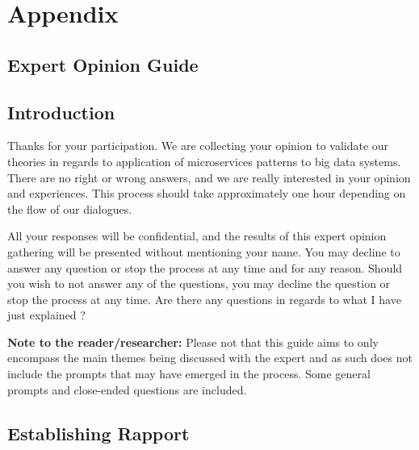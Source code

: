 \documentclass{bmcart}
\begin{document}
\section*{Appendix}


\begin{backmatter}

\section*{Expert Opinion Guide} \label{interviewGuide}

\subsection*{Introduction}

Thanks for your participation. We are collecting your opinion to validate our theories in regards to application of microservices patterns to big data systems. There are no right or wrong answers, and we are really interested in your opinion and experiences. This process should take approximately one hour depending on the flow of our dialogues. 

All your responses will be confidential, and the results of this expert opinion gathering will be presented without mentioning your name. You may decline to answer any question or stop the process at any time and for any reason. Should you wish to not answer any of the questions, you may decline the question or stop the process at any time. Are there any questions in regards to what I have just explained ?

\hspace{2cm}

\textbf{Note to the reader/researcher:} Please not that this guide aims to only encompass the main themes being discussed with the expert and as such does not include the prompts that may have emerged in the process. Some general prompts and close-ended questions are included.


\subsection*{\textbf{Establishing Rapport}}


\end{backmatter}
\end{document}
